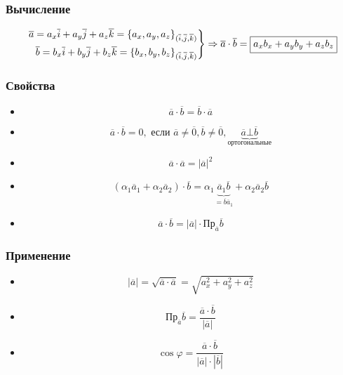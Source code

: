 \documentclass{article}
\newenvironment{rcases}
    {\left.\begin{aligned}}
    {\end{aligned}\right\rbrace}
\begin{document}
\subsubsection{Вычисление}
\begin{align*}
    \begin{rcases}
        \overline{a} = a_x \overline{i} + a_y \overline{j} + a_z \overline{k} = \{a_x, a_y, a_z\}_{(\overline{i}, \overline{j}, \overline{k})} \\
        \overline{b} = b_x \overline{i} + b_y \overline{j} + b_z \overline{k} = \{b_x, b_y, b_z\}_{(\overline{i}, \overline{j}, \overline{k})}
    \end{rcases} \Rightarrow
    \overline{a} \cdot \overline{b} = \boxed{a_x b_x + a_y b_y + a_z b_z}
\end{align*}

\subsubsection{Свойства}
\begin{itemize}
    \item 
    \[
        \overline{a} \cdot \overline{b} = \overline{b} \cdot \overline{a}
    \]
    \item 
    \[
    \overline{a} \cdot \overline{b} = 0, 
    \text{ если } \overline{a} \neq \overline{0}, 
    \overline{b} \neq \overline{0}, 
    \underbrace{\overline{a} \bot \overline{b}}_{\text{ортогональные}}
    \]
    \item 
    \[
    \overline{a} \cdot \overline{a} = |\overline{a}|^2
    \]
    \item 
    \[
    (\alpha_1 \overline{a}_1 + \alpha_2 \overline{a}_2) \cdot \overline{b} =
    \alpha_1 \underbrace{\overline{a}_1 \overline{b}}_{= \overline{b} \overline{a}_1} + \alpha_2 \overline{a}_2 \overline{b}
    \]
    \item 
    \[
    \overline{a} \cdot \overline{b} = |\overline{a}| \cdot \text{Пр}_{\overline{a}} \overline{b}
    \]
\end{itemize}

\subsubsection{Применение}
\begin{itemize}
    \item 
    \[
    |\overline{a}| = \sqrt{\overline{a} \cdot \overline{a}} = \sqrt{a_x^2 + a_y^2 + a_z^2}
    \]
    \item 
    \[
    \text{Пр}_{\overline{a}} \overline{b} =\frac{\overline{a} \cdot \overline{b}}{|\overline{a}|}
    \]
    \item 
    \[
    \cos \varphi = \frac{\overline{a} \cdot \overline{b}}{|\overline{a}| \cdot |\overline{b}|}
    \]
\end{itemize}
\end{document}
